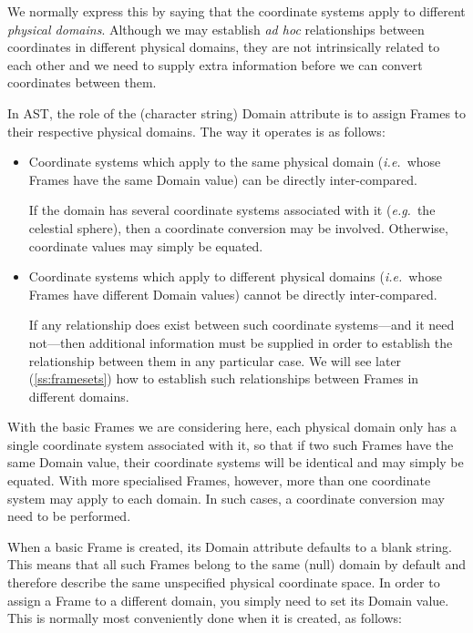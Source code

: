 \documentclass[twoside,11pt]{article}
\newcommand{\secref}[1]{\S\ref{#1}}
\renewcommand{\secref}[1]{\ref{#1}}
\begin{document}
We normally express this by saying that the coordinate systems apply
to different {\em{physical domains}}. Although we may establish
{\em{ad hoc}} relationships between coordinates in different physical
domains, they are not intrinsically related to each other and we need
to supply extra information before we can convert coordinates between
them.

In AST, the role of the (character string) Domain attribute is to
assign Frames to their respective physical domains. The way it
operates is as follows:

\begin{itemize}
\item Coordinate systems which apply to the same physical domain
({\em{i.e.}}\ whose Frames have the same Domain value) can be directly
inter-compared.

If the domain has several coordinate systems associated with it
({\em{e.g.}}\ the celestial sphere), then a coordinate conversion may
be involved. Otherwise, coordinate values may simply be equated.

\item Coordinate systems which apply to different physical domains
({\em{i.e.}}\ whose Frames have different Domain values) cannot be
directly inter-compared.

If any relationship does exist between such coordinate systems---and
it need not---then additional information must be supplied in order to
establish the relationship between them in any particular case. We
will see later (\secref{ss:framesets}) how to establish such
relationships between Frames in different domains.
\end{itemize}

With the basic Frames we are considering here, each physical domain
only has a single coordinate system associated with it, so that if two
such Frames have the same Domain value, their coordinate systems will
be identical and may simply be equated. With more specialised Frames,
however, more than one coordinate system may apply to each domain. In
such cases, a coordinate conversion may need to be performed.

When a basic Frame is created, its Domain attribute defaults to a
blank string. This means that all such Frames belong to the same
(null) domain by default and therefore describe the same unspecified
physical coordinate space. In order to assign a Frame to a different
domain, you simply need to set its Domain value. This is normally most
conveniently done when it is created, as follows:
\end{document}

